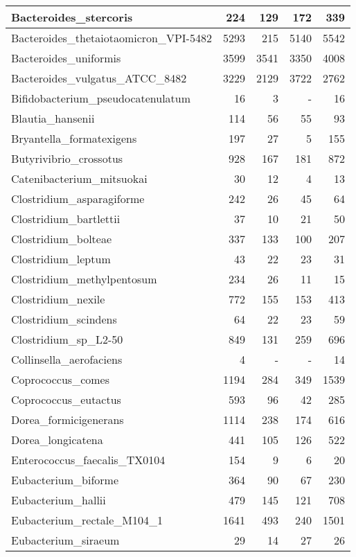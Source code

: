 \documentclass[12pt,a4paper]{article}
\begin{document}
\begin{table}[ht]
\begin{center}
\begin{tabular}{|l*{4}{|r}|}
Bacteroides\_stercoris & 224 & 129 & 172 & 339 \\ \hline
Bacteroides\_thetaiotaomicron\_VPI-5482 & 5293 & 215 & 5140 & 5542 \\ \hline
Bacteroides\_uniformis & 3599 & 3541 & 3350 & 4008 \\ \hline
Bacteroides\_vulgatus\_ATCC\_8482 & 3229 & 2129 & 3722 & 2762 \\ \hline
Bifidobacterium\_pseudocatenulatum & 16 & 3 & - & 16 \\ \hline
Blautia\_hansenii & 114 & 56 & 55 & 93 \\ \hline
Bryantella\_formatexigens & 197 & 27 & 5 & 155 \\ \hline
Butyrivibrio\_crossotus & 928 & 167 & 181 & 872 \\ \hline
Catenibacterium\_mitsuokai & 30 & 12 & 4 & 13 \\ \hline
Clostridium\_asparagiforme & 242 & 26 & 45 & 64 \\ \hline
Clostridium\_bartlettii & 37 & 10 & 21 & 50 \\ \hline
Clostridium\_bolteae & 337 & 133 & 100 & 207 \\ \hline
Clostridium\_leptum & 43 & 22 & 23 & 31 \\ \hline
Clostridium\_methylpentosum & 234 & 26 & 11 & 15 \\ \hline
Clostridium\_nexile & 772 & 155 & 153 & 413 \\ \hline
Clostridium\_scindens & 64 & 22 & 23 & 59 \\ \hline
Clostridium\_sp\_L2-50 & 849 & 131 & 259 & 696 \\ \hline
Collinsella\_aerofaciens & 4 & - & - & 14 \\ \hline
Coprococcus\_comes & 1194 & 284 & 349 & 1539 \\ \hline
Coprococcus\_eutactus & 593 & 96 & 42 & 285 \\ \hline
Dorea\_formicigenerans & 1114 & 238 & 174 & 616 \\ \hline
Dorea\_longicatena & 441 & 105 & 126 & 522 \\ \hline
Enterococcus\_faecalis\_TX0104 & 154 & 9 & 6 & 20 \\ \hline
Eubacterium\_biforme & 364 & 90 & 67 & 230 \\ \hline
Eubacterium\_hallii & 479 & 145 & 121 & 708 \\ \hline
Eubacterium\_rectale\_M104\_1 & 1641 & 493 & 240 & 1501 \\ \hline
Eubacterium\_siraeum & 29 & 14 & 27 & 26 \\ \hline

\end{tabular}
\end{center}
\end{table}
\end{document}

